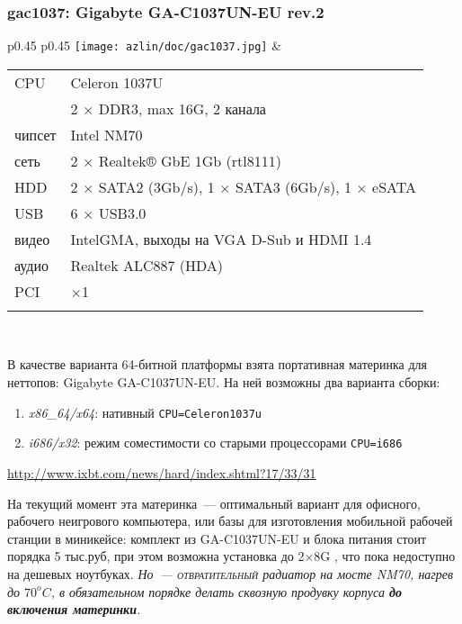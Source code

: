 
\subsubsection{gac1037: Gigabyte GA-C1037UN-EU rev.2}

\begin{tabular}{p{0.45\textheight} p{0.45\textheight}}
\texttt{[image: azlin/doc/gac1037.jpg]} &
\begin{tabular}{l l}
CPU & Celeron 1037U \\
\ram & 2 $\times$ DDR3, max 16G, 2 канала \\
чипсет & Intel NM70 \\
сеть & 2 $\times$ Realtek® GbE 1Gb (rtl8111) \\
HDD & 2 $\times$ SATA2 (3Gb/s), 1 $\times$ SATA3 (6Gb/s), 1 $\times$ eSATA\\
USB & 6 $\times$ USB3.0 \\
видео & IntelGMA, выходы на VGA D-Sub и HDMI 1.4\\
аудио & Realtek ALC887 (HDA) \\
PCI & $\times$1 \\
&\\
\end{tabular}
\\
\end{tabular}

В качестве варианта 64-битной платформы взята портативная материнка для
неттопов: Gigabyte GA-C1037UN-EU. На ней возможны два варианта сборки:

\begin{enumerate}
  \item \emph{x86\_64/x64}: нативный \verb|CPU=Celeron1037u|
  \item \emph{i686/x32}: режим соместимости со старыми процессорами
  \verb|CPU=i686|
\end{enumerate}

\url{http://www.ixbt.com/news/hard/index.shtml?17/33/31}

\clearpage
На текущий момент эта материнка\ --- оптимальный вариант для офисного, рабочего
неигрового компьютера, или базы для изготовления мобильной рабочей станции в
миникейсе: комплект из GA-C1037UN-EU и блока питания стоит порядка 5 тыс.руб,
при этом возможна установка до 2$\times$8G \ram, что пока недоступно на дешевых
ноутбуках. \emph{Но\ --- \textsc{отвратительный} радиатор на мосте NM70, нагрев
до $70^{o}C$, в обязательном порядке делать сквозную продувку корпуса \textbf{до
включения материнки}.}

